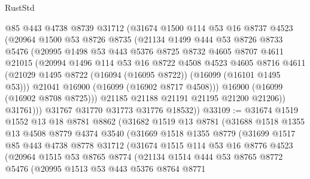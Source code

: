\begin{lexlean}{RustStd}
\begin{coremodule}
            @85
            @443
            @4738
            @8739
            @31712
            (@31674
              @1500
              @114
              @53
              @16
              @8737
              @4523
              (@20964
                @1500
                @53
                @8726
                @8735
                (@21134
                  @1499
                  @444
                  @53
                  @8726
                  @8733
                  @5476
                  (@20995
                    @1498
                    @53
                    @443
                    @5376
                    @8725
                    @8732
                    @4605
                    @8707
                    @4611
                    @21015
                    (@20994
                      @1496
                      @114
                      @53
                      @16
                      @8722
                      @4508
                      @4523
                      @4605
                      @8716
                      @4611
                      (@21029 @1495 @8722 (@16094 (@16095 @8722)) (@16099 (@16101 @1495 @53)))
                      @21041
                      @16900
                      (@16099 (@16902 @8717 @4508)))
                    @16900
                    (@16099 (@16902 @8708 @8725)))
                  @21185
                  @21188
                  @21191
                  @21195
                  @21200
                  @21206))
              @31761)))
        @31767
        @31770
        @31773
        @31776
        @18532))
@33109 := @31674
    @1519
    @1552
    @13
    @18
    @8781
    @8862
    (@31682
      @1519
      @13
      @8781
      (@31688
        @1518
        @1355
        @13
        @4508
        @8779
        @4374
        @3540
        (@31669
          @1518
          @1355
          @8779
          (@31699
            @1517
            @85
            @443
            @4738
            @8778
            @31712
            (@31674
              @1515
              @114
              @53
              @16
              @8776
              @4523
              (@20964
                @1515
                @53
                @8765
                @8774
                (@21134
                  @1514
                  @444
                  @53
                  @8765
                  @8772
                  @5476
                  (@20995
                    @1513
                    @53
                    @443
                    @5376
                    @8764
                    @8771

\end{coremodule}
\end{lexlean}

